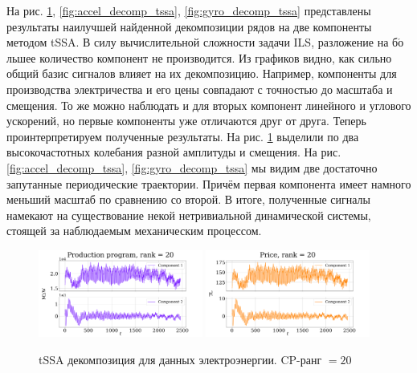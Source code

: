 			На рис. \ref{fig:electr_decomp_tssa}, \ref{fig:accel_decomp_tssa}, \ref{fig:gyro_decomp_tssa} представлены результаты наилучшей найденной декомпозиции рядов на две компоненты методом tSSA. В силу вычислительной сложности задачи ILS, разложение на б$\acute{\text{о}}$льшее количество компонент не производится. Из графиков видно, как сильно общий базис сигналов влияет на их декомпозицию. Например, компоненты для производства электричества и его цены совпадают с точностью до масштаба и смещения. То же можно наблюдать и для вторых компонент линейного и углового ускорений, но первые компоненты уже отличаются друг от друга. Теперь проинтерпретируем полученные результаты. На рис. \ref{fig:electr_decomp_tssa} выделили по два высокочастотных колебания разной амплитуды и смещения. На рис. \ref{fig:accel_decomp_tssa}, \ref{fig:gyro_decomp_tssa} мы видим две достаточно запутанные периодические траектории. Причём первая компонента имеет намного меньший масштаб по сравнению со второй. В итоге, полученные сигналы намекают на существование некой нетривиальной динамической системы, стоящей за наблюдаемым механическим процессом.
			
			\begin{figure}[h]
				\centering
				\includegraphics[width=0.48\textwidth, keepaspectratio]{../experiments/electricity/tssa/figs/decomposition/cpd_rank_20/Production program.png}
				\includegraphics[width=0.48\textwidth, keepaspectratio]{../experiments/electricity/tssa/figs/decomposition/cpd_rank_20/Price.png}
				\caption{tSSA декомпозиция для данных электроэнергии. CP-ранг $ = 20 $}\label{fig:electr_decomp_tssa}
			\end{figure}
			
